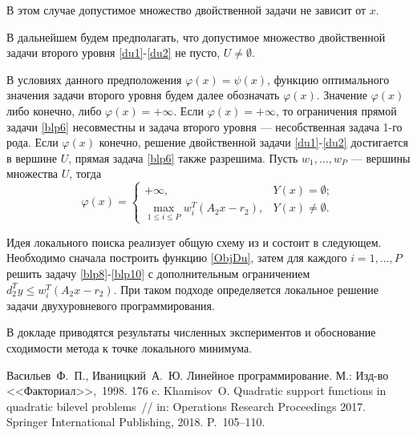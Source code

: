 В этом случае допустимое множество двойственной задачи не зависит от $x$. 

В дальнейшем будем предполагать, что допустимое множество двойственной задачи второго уровня \eqref{du1}-\eqref{du2} не пусто, $U\ne\emptyset$.

В условиях данного предположения $\varphi(x)=\psi(x)$, функцию оптимального значения задачи второго уровня будем далее обозначать $\varphi(x)$. 
Значение $\varphi(x)$ либо конечно, либо $\varphi(x)=+\infty$. Если $\varphi(x)=+\infty$, то ограничения прямой задачи \eqref{blp6} несовместны \cite{FPV_I_LP} и задача второго уровня --- несобственная задача 1-го рода. 
Если $\varphi(x)$ конечно, решение двойственной задачи \eqref{du1}-\eqref{du2} достигается в вершине $U$, прямая задача \eqref{blp6} также разрешима. Пусть $w_1,\ldots,w_P$ --- вершины множества $U$, тогда
\begin{equation}
\varphi(x)=\begin{cases}
+\infty, & Y(x)=\emptyset;\\
\max\limits_{1\leqslant i\leqslant P}w_i^T(A_2x-r_2), & Y(x)\ne\emptyset.
\end{cases}
\label{ObjDu}
\end{equation}

Идея локального поиска реализует общую схему из \cite{Khamisov} и состоит в следующем. Необходимо сначала построить функцию \eqref{ObjDu}, затем для каждого $i=1,\ldots,P$ решить задачу \eqref{blp8}-\eqref{blp10} 
с дополнительным ограничением $d^T_2y\leqslant w_i^T(A_2x-r_2)$. При таком подходе определяется локальное решение задачи двухуровневого программирования.

В докладе приводятся результаты численных экспериментов и обоснование сходимости метода к точке локального минимума.

\begin{thebibliography}{9} %
 Васильев~Ф.~П., Иваницкий~А.~Ю. Линейное программирование.  М.: Изд-во <<Факториал>>,~1998.  176 c.
 Khamisov~O. Quadratic support functions in quadratic bilevel problems~// in: Operations Research Proceedings 2017. Springer International Publishing, 2018. P.~105--110.
\end{thebibliography}





%

